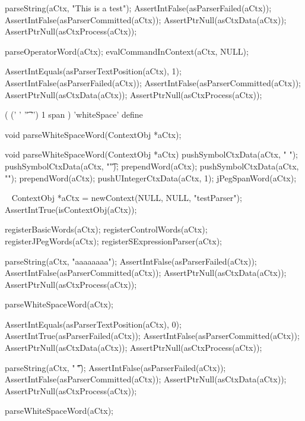 \startCTest
  parseString(aCtx, "This is a test");
  AssertIntFalse(asParserFailed(aCtx));
  AssertIntFalse(asParserCommitted(aCtx));
  AssertPtrNull(asCtxData(aCtx));
  AssertPtrNull(asCtxProcess(aCtx));
  
  parseOperatorWord(aCtx);
  evalCommandInContext(aCtx, NULL);
  
  AssertIntEquals(asParserTextPosition(aCtx), 1);
  AssertIntFalse(asParserFailed(aCtx));
  AssertIntFalse(asParserCommitted(aCtx));
  AssertPtrNull(asCtxData(aCtx));
  AssertPtrNull(asCtxProcess(aCtx));
\stopCTest
\stopTestCase
\stopTestSuite

\startTestSuite[parseWhiteSpaceWord]

\starttyping
(
  (' ' '\t' '\n') 1 span
) 'whiteSpace' define
\stoptyping

\startCHeader
void parseWhiteSpaceWord(ContextObj *aCtx);
\stopCHeader

\startCCode
void parseWhiteSpaceWord(ContextObj *aCtx) {
  pushSymbolCtxData(aCtx, " ");
  pushSymbolCtxData(aCtx, "\t");
  prependWord(aCtx);
  pushSymbolCtxData(aCtx, "\n");
  prependWord(aCtx);
  pushUIntegerCtxData(aCtx, 1);
  jPegSpanWord(aCtx);
}
\stopCCode

\CTestsSuiteSetup\
\startCTest
  ContextObj *aCtx = newContext(NULL, NULL, "testParser");
  AssertIntTrue(isContextObj(aCtx));
  
  registerBasicWords(aCtx);
  registerControlWords(aCtx);
  registerJPegWords(aCtx);
  registerSExpressionParser(aCtx);
\stopCTest

\startCTest
  parseString(aCtx, "aaaaaaaa");
  AssertIntFalse(asParserFailed(aCtx));
  AssertIntFalse(asParserCommitted(aCtx));
  AssertPtrNull(asCtxData(aCtx));
  AssertPtrNull(asCtxProcess(aCtx));
  
  parseWhiteSpaceWord(aCtx);
  
  AssertIntEquals(asParserTextPosition(aCtx), 0);
  AssertIntTrue(asParserFailed(aCtx));
  AssertIntFalse(asParserCommitted(aCtx));
  AssertPtrNull(asCtxData(aCtx));
  AssertPtrNull(asCtxProcess(aCtx));
\stopCTest
\stopTestCase

\startCTest
  parseString(aCtx, " \t\naaa");
  AssertIntFalse(asParserFailed(aCtx));
  AssertIntFalse(asParserCommitted(aCtx));
  AssertPtrNull(asCtxData(aCtx));
  AssertPtrNull(asCtxProcess(aCtx));
  
  parseWhiteSpaceWord(aCtx);
  
